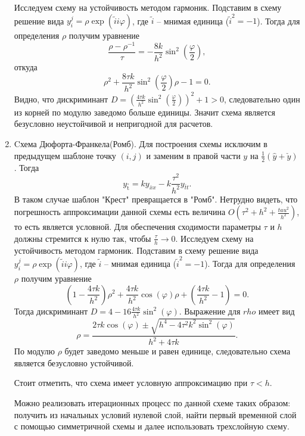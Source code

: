 \documentclass[12pt, a4paper]{article}
\renewcommand{\phi}{\varphi}
\newcommand{\widecheck}[1]{\check{#1}}
\newcommand{\down}[1]{\widecheck{#1}}
\newcommand{\pon}[1]{\mathop {#1}\limits^ \circ}
\begin{document}
\begin{enumerate}
		Исследуем схему на устойчивость методом гармоник. Подставим в схему решение вида $y_i^j = \rho \exp{(\widetilde{i} i \phi)}$, где $\widetilde{i}$ -- мнимая единица ($\widetilde{i}^2 = -1$). Тогда для определения $\rho$ получим уравнение
		\begin{equation*}
			\frac{\rho-\rho^{-1}}{\tau} = -\frac{8k}{h^2}\sin^2(\frac{\phi}{2}),
		\end{equation*}
		откуда
		\begin{equation*}
		\rho^2 + \frac{8\tau k}{h^2} \sin^2(\frac{\phi}{2}) \rho - 1 = 0.
		\end{equation*}
		Видно, что дискриминант $D = (\frac{4\tau k}{h^2} \sin^2(\frac{\phi}{2}))^2 + 1 > 0$, следовательно один из корней по модулю заведомо больше единицы. Значит схема является безусловно неустойчивой и непригодной для расчетов.
		\item Cхема Дюфорта-Франкела(Ромб).
		Для построения схемы исключим в предыдущем шаблоне точку $(i, j)$ и заменим в правой части $y$ на $\frac{1}{2}(\hat{y} + \down{y})$. Тогда
		\begin{equation*}
			y_{\pon{t}} = k y_{\bar{x}x} - k \frac{\tau^2}{h^2} y_{\bar{t}t}.
		\end{equation*}
		В таком случае шаблон "Крест" превращается в "Ромб". Нетрудно видеть, что погрешность аппроксимации данной схемы есть величина $O(\tau^2 + h^2 + \frac{tau^2}{h^2})$, то есть является условной. Для обеспечения сходимости параметры $\tau$ и $h$ должны стремится к нулю так, чтобы $\frac{\tau}{h} \to 0$. 
		Исследуем схему на устойчивость методом гармоник. Подставим в схему решение вида $y_i^j = \rho \exp{(\widetilde{i} i \phi)}$, где $\widetilde{i}$ -- мнимая единица ($\widetilde{i}^2 = -1$). Тогда для определения $\rho$ получим уравнение
		\begin{equation*}
			(1 - \frac{4 \tau k}{h^2}) \rho^2 + \frac{4 \tau k} {h^2} \cos(\phi) \rho + (\frac{4 \tau k} {h^2} - 1) = 0.
		\end{equation*}
		Тогда дискриминант $D = 4 - 16 \frac{4 \tau k} {h^2} \sin^2(\phi)$. Выражение для $rho$ имеет вид
		\begin{equation*}
			\rho = \frac{2 \tau k \cos(\phi) \pm \sqrt{h^4 - 4\tau^2 k^2 \sin^2(\phi)}}{h^2 + 4\tau k}.
		\end{equation*}
		По модулю $\rho$ будет заведомо меньше и равен единице, следовательно схема является безусловно устойчивой. 
		
		Стоит отметить, что схема имеет условную аппроксимацию при $\tau < h$.
		
		
		Можно реализовать итерационных процесс по данной схеме таких образом: получить из начальных условий нулевой слой, найти первый временной слой с помощью симметричной схемы и далее использовать трехслойную схему.
	\end{enumerate}
	
\end{document}

